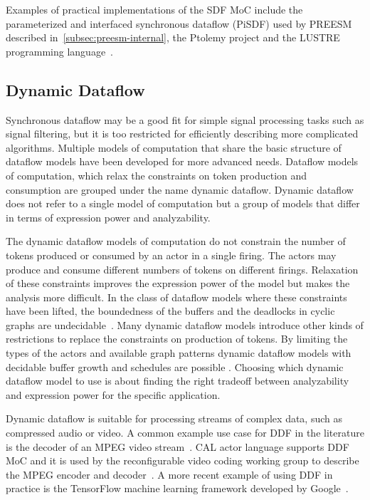 Examples of practical implementations of the SDF MoC include the parameterized and interfaced synchronous dataflow (PiSDF) used by PREESM described in~\ref{subsec:preesm-internal}, the Ptolemy project \cite{ekerjanneck2003ptolemy} and the LUSTRE programming language~\cite{halbwachs1991synchronous}.

\FloatBarrier
\subsection{Dynamic Dataflow}
\label{subsec:dynamic-dataflow}
Synchronous dataflow may be a good fit for simple signal processing tasks such as signal filtering, but it is too restricted for efficiently describing more complicated algorithms. Multiple models of computation that share the basic structure of dataflow models have been developed for more advanced needs. Dataflow models of computation, which relax the constraints on token production and consumption are grouped under the name dynamic dataflow. Dynamic dataflow does not refer to a single model of computation but a group of models that differ in terms of expression power and analyzability.~\cite{bhattacharyya2013handbook}

The dynamic dataflow models of computation do not constrain the number of tokens produced or consumed by an actor in a single firing. The actors may produce and consume different numbers of tokens on different firings. Relaxation of these constraints improves the expression power of the model but makes the analysis more difficult. In the class of dataflow models where these constraints have been lifted, the boundedness of the buffers and the deadlocks in cyclic graphs are undecidable~\cite{buck1993scheduling}. Many dynamic dataflow models introduce other kinds of restrictions to replace the constraints on production of tokens. By limiting the types of the actors and available graph patterns dynamic dataflow models with decidable buffer growth and schedules are possible \cite{bhattacharyya2013handbook, gao1992well}. Choosing which dynamic dataflow model to use is about finding the right tradeoff between analyzability and expression power for the specific application.

Dynamic dataflow is suitable for processing streams of complex data, such as compressed audio or video. A common example use case for DDF in the literature is the decoder of an MPEG video stream~\cite{bhattacharyya2013handbook}. CAL actor language supports DDF MoC and it is used by the reconfigurable video coding working group to describe the MPEG encoder and decoder~\cite{bhattacharyya2011overview}. A more recent example of using DDF in practice is the TensorFlow machine learning framework developed by Google~\cite{tensorflow2015-whitepaper}.
